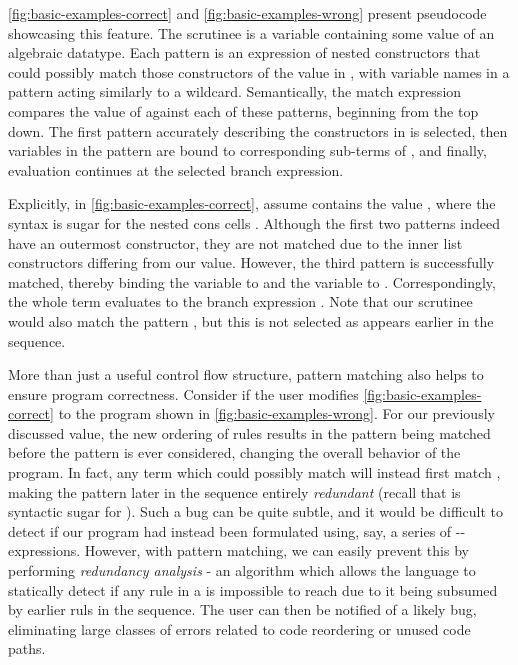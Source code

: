 \autoref{fig:basic-examples-correct} and \autoref{fig:basic-examples-wrong} present pseudocode showcasing this feature. The scrutinee is a variable  containing some value of an algebraic datatype. Each pattern is an expression of nested constructors that could possibly match those constructors of the value in , with variable names in a pattern acting similarly to a wildcard. Semantically, the match expression compares the value of  against each of these patterns, beginning from the top down. The first pattern accurately describing the constructors in  is selected, then variables in the pattern are bound to corresponding sub-terms of , and finally, evaluation continues at the selected branch expression. 

Explicitly, in \autoref{fig:basic-examples-correct}, assume  contains the value , where the syntax \li{[x , y]} is sugar for the nested cons cells . Although the first two patterns indeed have an outermost  constructor, they are not matched due to the inner list constructors differing from our value. However, the third pattern  is successfully matched, thereby binding the variable  to  and the variable  to . Correspondingly, the whole term evaluates to the branch expression . Note that our scrutinee would also match the pattern , but this is not selected as  appears earlier in the sequence.

More than just a useful control flow structure, pattern matching also helps to ensure program correctness. Consider if  the user modifies \autoref{fig:basic-examples-correct} to the program shown in \autoref{fig:basic-examples-wrong}. For our previously discussed value, the new ordering of rules results in the pattern  being matched before the pattern  is ever considered, changing the overall behavior of the program. In fact, any term which could possibly match  will instead first match , making the pattern later in the sequence entirely \emph{redundant} (recall that \li{[x, y]} is syntactic sugar for ). Such a bug can be quite subtle, and it would be difficult to detect if our program had instead been formulated using, say, a series of -- expressions. However, with pattern matching, we can easily prevent this by performing \emph{redundancy analysis} -  an algorithm which allows the language to statically detect if any rule in a  is impossible to reach due to it being subsumed by earlier ruls in the sequence. The user can then be notified of a likely bug, eliminating large classes of errors related to code reordering or unused code paths.

